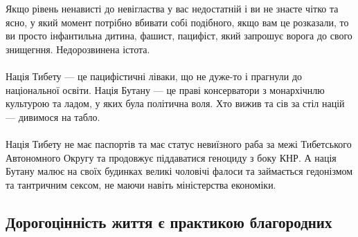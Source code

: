 \\
\\
Якщо рівень ненависті до невігластва у вас недостатній і ви не знаєте чітко та ясно,
у який момент потрібно вбивати собі подібного, якщо вам це розказали, то ви просто
інфантильна дитина, фашист, пацифіст, який запрошує ворога до свого знищегння. Недорозвинена істота.
\\
\\
Нація Тибету --- це пацифістичні ліваки, що не дуже-то і прагнули до національної освіти.
Нація Бутану --- це праві консерватори з монархічнлю культурою та ладом,
у яких була політична воля. Хто вижив та сів за стіл націй --- дивимося на табло.
\\
\\
Нація Тибету не має паспортів та має статус невиїзного раба за межі Тибетського Автономного Округу та
продовжує піддаватися геноциду з боку КНР. А нація Бутану малює на своїх будинках
великі чоловічі фалоси та займається гедонізмом та тантричним сексом,
не маючи навіть міністерства економіки.

\newpage

\subsection{Дорогоцінність життя є практикою благородних}

